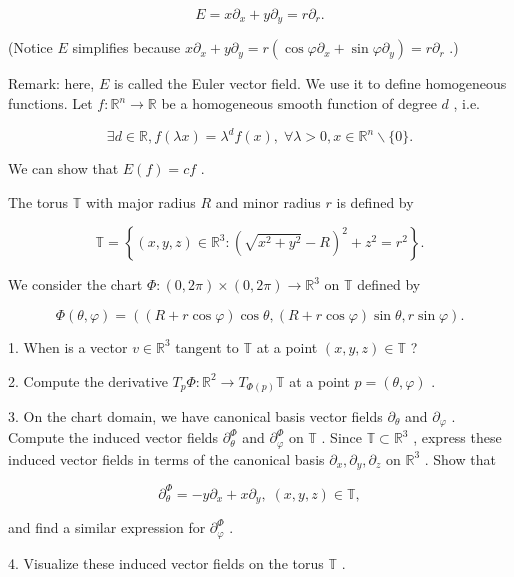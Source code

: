 \documentclass[10pt]{article}
\begin{document}
\[
E = x{\partial }_{x} + y{\partial }_{y} = r{\partial }_{r}.
\]

(Notice \(E\) simplifies because \(x{\partial }_{x} + y{\partial }_{y} = r\left( {\cos \varphi {\partial }_{x} + \sin \varphi {\partial }_{y}}\right)  = r{\partial }_{r}\) .)

Remark: here, \(E\) is called the Euler vector field. We use it to define homogeneous functions. Let \(f : {\mathbb{R}}^{n} \rightarrow  \mathbb{R}\) be a homogeneous smooth function of degree \(d\) , i.e.

\[
\exists d \in  \mathbb{R},f\left( {\lambda x}\right)  = {\lambda }^{d}f\left( x\right) ,\;\forall \lambda  > 0,x \in  {\mathbb{R}}^{n} \smallsetminus  \{ 0\} .
\]

We can show that \(E\left( f\right)  = {cf}\) .

\begin{problem}[title=PROBLEM 2 (8 POINTS)]
The torus \(\mathbb{T}\) with major radius \(R\) and minor radius \(r\) is defined by

\[
\mathbb{T} = \left\{  {\left( {x,y,z}\right)  \in  {\mathbb{R}}^{3} : {\left( \sqrt{{x}^{2} + {y}^{2}} - R\right) }^{2} + {z}^{2} = {r}^{2}}\right\}  .
\]

We consider the chart \(\Phi  : \left( {0,{2\pi }}\right)  \times  \left( {0,{2\pi }}\right)  \rightarrow  {\mathbb{R}}^{3}\) on \(\mathbb{T}\) defined by

\[
\Phi \left( {\theta ,\varphi }\right)  = \left( {\left( {R + r\cos \varphi }\right) \cos \theta ,\left( {R + r\cos \varphi }\right) \sin \theta ,r\sin \varphi }\right) .
\]

1. When is a vector \(v \in  {\mathbb{R}}^{3}\) tangent to \(\mathbb{T}\) at a point \(\left( {x,y,z}\right)  \in  \mathbb{T}\) ?

2. Compute the derivative \({T}_{p}\Phi  : {\mathbb{R}}^{2} \rightarrow  {T}_{\Phi \left( p\right) }\mathbb{T}\) at a point \(p = \left( {\theta ,\varphi }\right)\) .

3. On the chart domain, we have canonical basis vector fields \({\partial }_{\theta }\) and \({\partial }_{\varphi }\) . Compute the induced vector fields \({\partial }_{\theta }^{\Phi }\) and \({\partial }_{\varphi }^{\Phi }\) on \(\mathbb{T}\) . Since \(\mathbb{T} \subset  {\mathbb{R}}^{3}\) , express these induced vector fields in terms of the canonical basis \({\partial }_{x},{\partial }_{y},{\partial }_{z}\) on \({\mathbb{R}}^{3}\) . Show that

\[
{\partial }_{\theta }^{\Phi } =  - y{\partial }_{x} + x{\partial }_{y},\;\left( {x,y,z}\right)  \in  \mathbb{T},
\]

and find a similar expression for \({\partial }_{\varphi }^{\Phi }\) .

4. Visualize these induced vector fields on the torus \(\mathbb{T}\) .
\end{problem}
\end{document}
